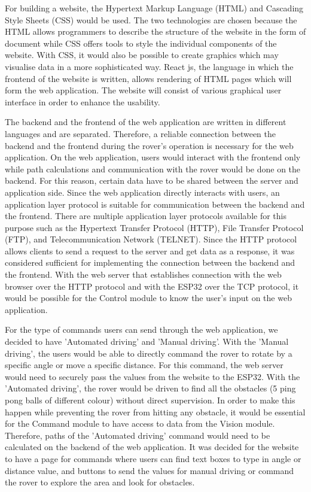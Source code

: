 \documentclass[a4paper]{article}
\begin{document}
For building a website, the Hypertext Markup Language (HTML) and Cascading Style Sheets (CSS) would 
be used. The two technologies are chosen because the HTML allows programmers to describe the structure 
of the website in the form of document while CSS offers tools to style the individual components of 
the website. With CSS, it would also be possible to create graphics which may visualise data in a more 
sophisticated way. React js, the language in which the frontend of the website is written, allows rendering 
of HTML pages which will form the web application. The website will consist of various graphical user 
interface in order to enhance the usability. 

The backend and the frontend of the web application are written in different languages 
and are separated. Therefore, a reliable connection between the backend and the frontend during the rover's 
operation is necessary for the web application. On the web application, users would 
interact with the frontend only while path calculations and communication with 
the rover would be done on the backend. For this reason, certain data have to be 
shared between the server and application side. Since the web application directly interacts 
with users, an application layer protocol is suitable for communication between the 
backend and the frontend. There are multiple application layer protocols available 
for this purpose such as the Hypertext Transfer Protocol (HTTP), File Transfer Protocol (FTP), 
and Telecommunication Network (TELNET). Since the HTTP protocol allows clients to send 
a request to the server and get data as a response, it was considered sufficient for 
implementing the connection between the backend and the frontend. With the web server that 
establishes connection with the web browser over the HTTP protocol and with the ESP32 over 
the TCP protocol, it would be possible for the Control module to know the user's input on 
the web application. 

For the type of commands users can send through the web application, we decided to have 
'Automated driving' and 'Manual driving'. With the 'Manual driving', the users would be able 
to directly command the rover to rotate by a specific angle or move a specific distance. For 
this command, the web server would need to securely pass the values from the website to the ESP32. 
With the 'Automated driving', the rover would be driven to find all the obstacles (5 ping pong 
balls of different colour) without direct supervision. In order to make this happen while 
preventing the rover from hitting any obstacle, it would be essential for the Command module 
to have access to data from the Vision module. Therefore, paths of the 'Automated driving' 
command would need to be calculated on the backend of the web application. It was decided for 
the website to have a page for commands where users can find text boxes to type in angle or distance 
value, and buttons to send the values for manual driving or command the rover to explore the area 
and look for obstacles. 
\end{document}
